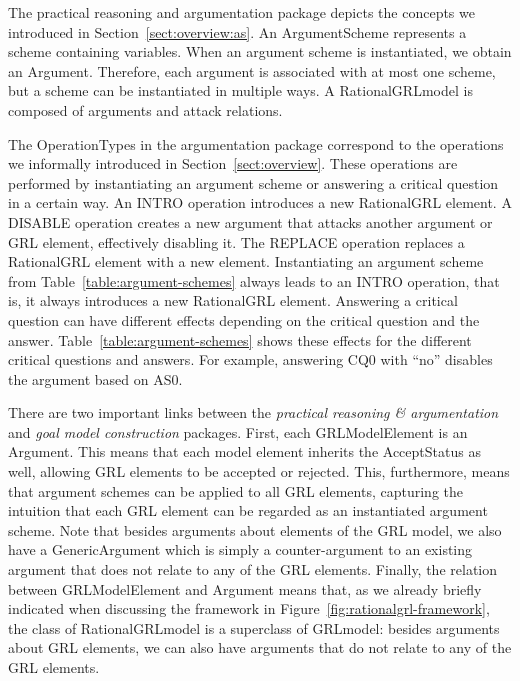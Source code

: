 The practical reasoning and argumentation package depicts the concepts we introduced in Section~\ref{sect:overview:as}. An \textsf{ArgumentScheme} represents a scheme containing variables. When an argument scheme is instantiated, we obtain an \textsf{Argument}. Therefore, each argument is associated with at most one scheme, but a scheme can be instantiated in multiple ways. A \textsf{RationalGRLmodel} is composed of arguments and attack relations.

The \textsf{OperationTypes} in the argumentation package correspond to the operations we informally introduced in Section~\ref{sect:overview}. These operations are performed by instantiating an argument scheme or answering a critical question in a certain way. An \textsf{INTRO} operation introduces a new RationalGRL element. A \textsf{DISABLE} operation creates a new argument that attacks another argument or GRL element, effectively disabling it. The \textsf{REPLACE} operation replaces a RationalGRL element with a new element. Instantiating an argument scheme from Table~\ref{table:argument-schemes} always leads to an \textsf{INTRO} operation, that is, it always introduces a new RationalGRL element. Answering a critical question can have different effects depending on the critical question and the answer. Table~\ref{table:argument-schemes} shows these effects for the different critical questions and answers. For example, answering CQ0 with ``no'' disables the argument based on AS0. 

There are two important links between the \emph{practical reasoning \& argumentation} and \emph{goal model construction} packages. First, each \textsf{GRLModelElement} is an \textsf{Argument}. This means that each model element inherits the \textsf{AcceptStatus} as well, allowing GRL elements to be accepted or rejected. This, furthermore, means that argument schemes can be applied to all GRL elements, capturing the intuition that each GRL element can be regarded as an instantiated argument scheme. Note that besides arguments about elements of the GRL model, we also have a \textsf{GenericArgument} which is simply a counter-argument to an existing argument that does not relate to any of the GRL elements. Finally, the relation between \textsf{GRLModelElement} and \textsf{Argument} means that, as we already briefly indicated when discussing the framework in Figure~\ref{fig:rationalgrl-framework}, the class of \textsf{RationalGRLmodel} is a superclass of \textsf{GRLmodel}: besides arguments about GRL elements, we can also have arguments that do not relate to any of the GRL elements.

